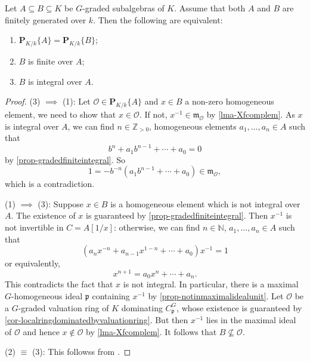 \begin{lemma}\label{lma-gradedRZaffeq}
    Let $A\subseteq B\subseteq K$ be $G$-graded subalgebras of $K$. Assume that both $A$ and $B$ are finitely generated over $k$. Then the following are equivalent:
    \begin{enumerate}
        \item $\mathbf{P}_{K/k}\{A\}=\mathbf{P}_{K/k}\{B\}$;
        \item $B$ is finite over $A$;
        \item $B$ is integral over $A$.
    \end{enumerate}
\end{lemma}
\begin{proof}
    (3) $\implies$ (1): Let $\mathcal{O}\in \mathbf{P}_{K/k}\{A\}$ and $x\in B$ a non-zero homogeneous element, we need to show that $x\in \mathcal{O}$. If not, $x^{-1}\in \mathfrak{m}_{\mathcal{O}}$ by \cref{lma-Xfcomplem}. As $x$ is integral over $A$, we can find $n\in \mathbb{Z}_{>0}$, homogeneous elements $a_1,\ldots,a_{n}\in A$ such that
    \[
        b^n+a_1 b^{n-1}+\cdots+a_0=0  
    \]
    by \cref{prop-gradedfiniteintegral}. So 
    \[
        1=-b^{-n}\left(a_1 b^{n-1}+\cdots+a_0\right)\in \mathfrak{m}_{\mathcal{O}},  
    \]
    which is a contradiction.

    (1) $\implies$ (3): Suppose $x\in B$ is a homogeneous element which is not integral over $A$. The existence of $x$ is guaranteed by \cref{prop-gradedfiniteintegral}. Then $x^{-1}$ is not invertible in $C=A[1/x]$: otherwise, we can find $n\in \mathbb{N}$, $a_1,\ldots,a_n\in A$ such that
    \[
        (a_nx^{-n}+a_{n-1}x^{1-n}+\cdots+a_0)x^{-1}=1  
    \]
    or equivalently,
    \[
        x^{n+1}=a_0x^n+\cdots+ a_n.  
    \]
    This contradicts the fact that $x$ is not integral. In particular, there is a maximal $G$-homogeneous ideal $\mathfrak{p}$ containing $x^{-1}$ by \cref{prop-notinmaximalidealunit}. Let $\mathcal{O}$ be a $G$-graded valuation ring of $K$ dominating $C_{\mathfrak{p}}^G$, whose existence is guaranteed by \cref{cor-localringdominatedbyvaluationring}.
    But then $x^{-1}$ lies in the maximal ideal of $\mathcal{O}$ and hence $x\not\in \mathcal{O}$ by \cref{lma-Xfcomplem}. It follows that $B\not\subseteq \mathcal{O}$.

    (2) $\equiv$ (3): This followss from \cite[\href{https://stacks.math.columbia.edu/tag/02JJ}{Tag 02JJ}]{stacks-project}.

\end{proof}

